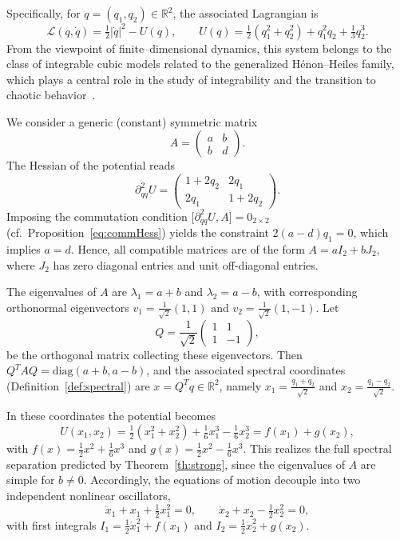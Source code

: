 \documentclass{rendiconti}
\begin{document}
Specifically, for $q=(q_1,q_2)\in\mathbb R^2$, the associated Lagrangian is
\begin{equation}
\mathcal{L}(q,\dot q)=\tfrac12 |\dot q|^2-U(q),
\qquad
U(q)=\tfrac12(q_1^2+q_2^2)+q_1^2 q_2+\tfrac13 q_2^3 .
\end{equation}
From the viewpoint of finite--dimensional dynamics, this system belongs to the
class of integrable cubic models related to the generalized
H\'enon--Heiles family, which plays a central role in the study of integrability
and the transition to chaotic behavior~\cite{HenonHeiles1964}.

We consider a generic (constant) symmetric matrix
\begin{equation}
A=
\begin{pmatrix}
a & b\\
b & d
\end{pmatrix}.
\end{equation}
The Hessian of the potential reads
\begin{equation}
\partial^2_{qq}U=
\begin{pmatrix}
1+2q_2 & 2q_1 \\
2q_1 & 1+2q_2
\end{pmatrix}.
\end{equation}
Imposing the commutation condition
$\big[\partial^2_{qq}U,A\big]=0_{2\times2}$ (cf.\ Proposition~\ref{eq:commHess})
yields the constraint $2(a-d)q_1=0$, which implies $a=d$.
Hence, all compatible matrices are of the form
$A=aI_2+bJ_2$, where $J_2$ has zero diagonal entries and unit off-diagonal
entries.

The eigenvalues of $A$ are $\lambda_1=a+b$ and $\lambda_2=a-b$, with corresponding
orthonormal eigenvectors
$v_1=\tfrac{1}{\sqrt2}(1,1)$ and $v_2=\tfrac{1}{\sqrt2}(1,-1)$.
Let
\begin{equation}
Q=\frac1{\sqrt2}
\begin{pmatrix}
1 & 1\\
1 & -1
\end{pmatrix},
\end{equation}
be the orthogonal matrix collecting these eigenvectors. Then
$Q^T A Q=\mathrm{diag}(a+b,a-b)$, and the associated spectral coordinates
(Definition~\ref{def:spectral}) are
$x=Q^T q \in \mathbb{R}^2$, namely
$x_1=\frac{q_1+q_2}{\sqrt2}$ and $x_2=\frac{q_1-q_2}{\sqrt2}$.

In these coordinates the potential becomes
\begin{equation}
U(x_1,x_2)=\tfrac12(x_1^2+x_2^2)+\tfrac16 x_1^3-\tfrac16 x_2^3
=f(x_1)+g(x_2),
\end{equation}
with $f(x)=\frac12 x^2+\frac16 x^3$ and
$g(x)=\frac12 x^2-\frac16 x^3$.
This realizes the full spectral separation predicted by
Theorem~\ref{th:strong}, since the eigenvalues of $A$ are simple for $b\neq0$.
Accordingly, the equations of motion decouple into two independent nonlinear
oscillators,
\begin{equation}
\ddot x_1+x_1+\tfrac12 x_1^2=0,
\qquad
\ddot x_2+x_2-\tfrac12 x_2^2=0,
\end{equation}
with first integrals
$I_1=\frac12\dot x_1^2+f(x_1)$ and
$I_2=\frac12\dot x_2^2+g(x_2)$.
\end{document}
